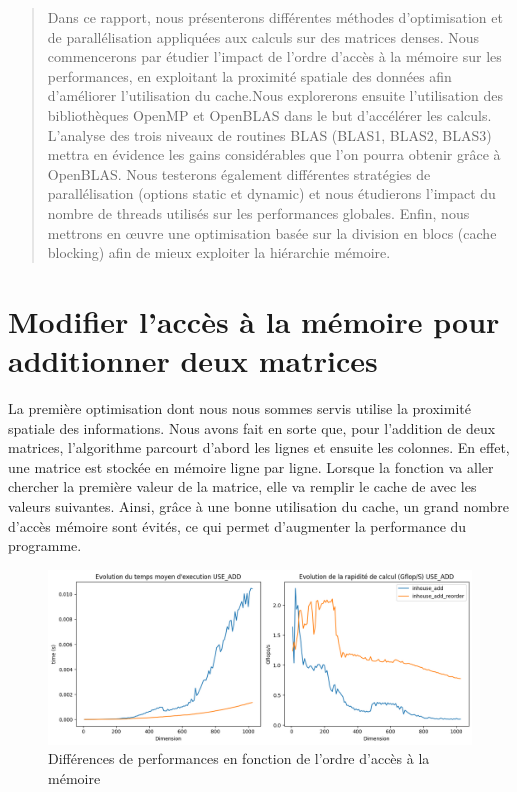 \documentclass{report}
\begin{document}
\begin{abstract}
    Dans ce rapport, nous présenterons différentes méthodes d’optimisation et de parallélisation appliquées aux calculs sur des matrices denses. Nous commencerons par étudier l’impact de l’ordre d’accès à la mémoire sur les performances, en exploitant la proximité spatiale des données afin d’améliorer l’utilisation du cache.Nous explorerons ensuite l’utilisation des bibliothèques OpenMP et OpenBLAS dans le but d’accélérer les calculs. L’analyse des trois niveaux de routines BLAS (BLAS1, BLAS2, BLAS3) mettra en évidence les gains considérables que l’on pourra obtenir grâce à OpenBLAS. Nous testerons également différentes stratégies de parallélisation (options static et dynamic) et nous étudierons l’impact du nombre de threads utilisés sur les performances globales. Enfin, nous mettrons en œuvre une optimisation basée sur la division en blocs (cache blocking) afin de mieux exploiter la hiérarchie mémoire.
\end{abstract}

\tableofcontents

\newpage


\chapter{Modifier l'accès à la mémoire pour additionner deux matrices}

La première optimisation dont nous nous sommes servis utilise la proximité spatiale des informations. Nous avons fait en sorte que, pour l'addition de deux matrices, l'algorithme parcourt d'abord les lignes et ensuite les colonnes. En effet, une matrice est stockée en mémoire ligne par ligne. Lorsque la fonction va aller chercher la première valeur de la matrice, elle va remplir le cache de avec les valeurs suivantes. Ainsi, grâce à une bonne utilisation du cache, un grand nombre d'accès mémoire sont évités, ce qui permet d'augmenter la performance du programme.

\begin{figure}[H]
    \centering
    \includegraphics[width=0.7\linewidth]{images/fig3.png}
    \caption{Différences de performances en fonction de l'ordre d'accès à la mémoire}
    \label{fig:3}
\end{figure}
\end{document}
